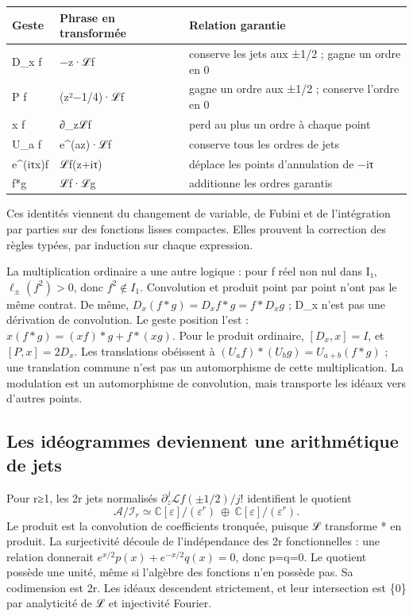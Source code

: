 \documentclass[
  10pt,
  a4paper,
]{article}
\begin{document}
\begin{longtable}[]{@{}lll@{}}
\toprule\noalign{}
Geste & Phrase en transformée & Relation garantie \\
\midrule\noalign{}
\endhead
\bottomrule\noalign{}
\endlastfoot
D\_x f & −z·ℒf & conserve les jets aux ±1/2 ; gagne un ordre en 0 \\
P f & (z²−1/4)·ℒf & gagne un ordre aux ±1/2 ; conserve l'ordre en 0 \\
x f & ∂\_zℒf & perd au plus un ordre à chaque point \\
U\_a f & e\^{}(az)·ℒf & conserve tous les ordres de jets \\
e\^{}(iτx)f & ℒf(z+iτ) & déplace les points d'annulation de −iτ \\
f*g & ℒf·ℒg & additionne les ordres garantis \\
\end{longtable}

Ces identités viennent du changement de variable, de Fubini et de
l'intégration par parties sur des fonctions lisses compactes. Elles
prouvent la correction des règles typées, par induction sur chaque
expression.

La multiplication ordinaire a une autre logique : pour f réel non nul
dans I₁, \(\ell_\pm(f^2)>0\), donc \(f^2\notin I_1\). Convolution et
produit point par point n'ont pas le même contrat. De même,
\(D_x(f*g)=D_xf*g=f*D_xg\) ; D\_x n'est pas une dérivation de
convolution. Le geste position l'est : \(x(f*g)=(xf)*g+f*(xg)\). Pour le
produit ordinaire, \([D_x,x]=I\), et \([P,x]=2D_x\). Les translations
obéissent à \((U_af)*(U_bg)=U_{a+b}(f*g)\) ; une translation commune
n'est pas un automorphisme de cette multiplication. La modulation est un
automorphisme de convolution, mais transporte les idéaux vers d'autres
points.

\hypertarget{les-iduxe9ogrammes-deviennent-une-arithmuxe9tique-de-jets}{%
\subsection{Les idéogrammes deviennent une arithmétique de
jets}\label{les-iduxe9ogrammes-deviennent-une-arithmuxe9tique-de-jets}}

Pour r≥1, les 2r jets normalisés \(\partial_z^j\mathscr Lf(\pm1/2)/j!\)
identifient le quotient \[
\mathcal A/\mathcal I_r\simeq
\mathbb C[\varepsilon]/(\varepsilon^r)\ \oplus\
\mathbb C[\varepsilon]/(\varepsilon^r).
\] Le produit est la convolution de coefficients tronquée, puisque ℒ
transforme * en produit. La surjectivité découle de l'indépendance des
2r fonctionnelles : une relation donnerait
\(e^{x/2}p(x)+e^{-x/2}q(x)=0\), donc p=q=0. Le quotient possède une
unité, même si l'algèbre des fonctions n'en possède pas. Sa codimension
est 2r. Les idéaux descendent strictement, et leur intersection est
\{0\} par analyticité de ℒ et injectivité Fourier.
\end{document}
